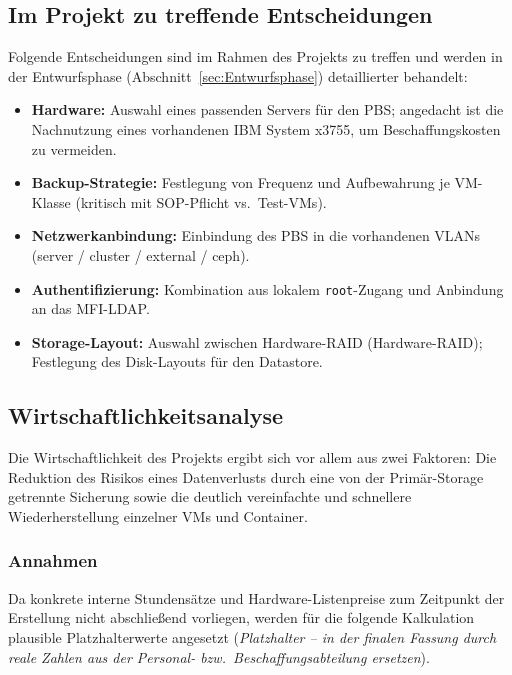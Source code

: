 \subsection{Im Projekt zu treffende Entscheidungen}
\label{sec:Entscheidungen}
Folgende Entscheidungen sind im Rahmen des Projekts zu treffen und
werden in der Entwurfsphase (Abschnitt~\ref{sec:Entwurfsphase})
detaillierter behandelt:
\begin{itemize}
    \item \textbf{Hardware:} Auswahl eines passenden Servers für den
          \ac{PBS}; angedacht ist die Nachnutzung eines vorhandenen
          IBM System x3755, um Beschaffungskosten zu vermeiden.
    \item \textbf{Backup-Strategie:} Festlegung von Frequenz und
          Aufbewahrung je \ac{VM}-Klasse (kritisch mit
          \ac{SOP}-Pflicht vs.\ Test-\acp{VM}).
    \item \textbf{Netzwerkanbindung:} Einbindung des \ac{PBS} in die
          vorhandenen \acp{VLAN} (server / cluster / external / ceph).
    \item \textbf{Authentifizierung:} Kombination aus lokalem
          \texttt{root}-Zugang und Anbindung an das \ac{MFI}-\ac{LDAP}.
    \item \textbf{Storage-Layout:} Auswahl zwischen Hardware-\ac{RAID}
          (Hardware-\ac{RAID}); Festlegung des Disk-Layouts für den Datastore.
\end{itemize}


\subsection{Wirtschaftlichkeitsanalyse}
\label{sec:Wirtschaftlichkeitsanalyse}
Die Wirtschaftlichkeit des Projekts ergibt sich vor allem aus zwei
Faktoren: Die Reduktion des Risikos eines Datenverlusts durch eine von
der Primär-Storage getrennte Sicherung sowie die deutlich vereinfachte
und schnellere Wiederherstellung einzelner \acp{VM} und Container.

\subsubsection*{Annahmen}
Da konkrete interne Stundensätze und Hardware-Listenpreise zum
Zeitpunkt der Erstellung nicht abschließend vorliegen, werden für die
folgende Kalkulation plausible Platzhalterwerte angesetzt
(\emph{Platzhalter -- in der finalen Fassung durch reale Zahlen aus
der Personal- bzw.\ Beschaffungsabteilung ersetzen}).

